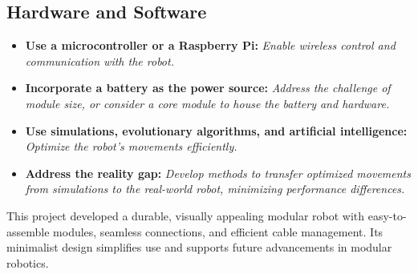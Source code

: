 \documentclass[12pt,a3paper]{article}
\begin{document}
{\begin{multicols}{2}
       \subsection*{Hardware and Software}
       \begin{itemize}
       \setlength\itemsep{0.1em}
           \item \textbf{Use a microcontroller or a Raspberry Pi:} {\small \textit{Enable wireless control and communication with the robot.}}
           \item \textbf{Incorporate a battery as the power source:} {\small \textit{Address the challenge of module size, or consider a core module to house the battery and hardware.}}
           \item \textbf{Use simulations, evolutionary algorithms, and artificial intelligence:} {\small \textit{Optimize the robot's movements efficiently.}}
           \item \textbf{Address the reality gap:} {\small \textit{Develop methods to transfer optimized movements from simulations to the real-world robot, minimizing performance differences.}}
       \end{itemize}

       This project developed a durable, visually appealing modular robot with easy-to-assemble modules, seamless connections, and efficient cable management. Its minimalist design simplifies use and supports future advancements in modular robotics.
   
   \end{multicols}
}
\end{document}
